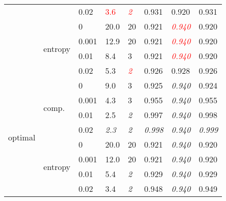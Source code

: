 \begin{table}[h]
\begin{tabularx}{\textwidth}{|X|X|X|X|X|X|X|X|}
		&                          & 0.02      & \textcolor{red}{3.6}     & \textcolor{red}{\textit{2}} & 0.931          & 0.920                & 0.931          \\ \cline{2-8} 
		& \multirow{4}{*}{entropy} & 0         & 20.0          & 20               & 0.921          & \textcolor{red}{\textit{0.940}} & 0.920          \\ \cline{3-8} 
		&                          & 0.001     & 12.9          & 20               & 0.921          & \textcolor{red}{\textit{0.940}} & 0.920          \\ \cline{3-8} 
		&                          & 0.01      & 8.4           & 3                & 0.921          & \textcolor{red}{\textit{0.940}} & 0.920          \\ \cline{3-8} 
		&                          & 0.02      & 5.3           & \textcolor{red}{\textit{2}} & 0.926          & 0.928                & 0.926          \\ \hline
		\multirow{8}{*}{optimal} & \multirow{4}{*}{comp.}   & 0         & 9.0           & 3                & 0.925          & \textit{0.940}       & 0.924          \\ \cline{3-8} 
		&                          & 0.001     & 4.3           & 3                & 0.955          & \textit{0.940}       & 0.955          \\ \cline{3-8} 
		&                          & 0.01      & 2.5           & \textit{2}       & 0.997          & \textit{0.940}       & 0.998          \\ \cline{3-8} 
		&                          & 0.02      & \textit{2.3}  & \textit{2}       & \textit{0.998} & \textit{0.940}       & \textit{0.999} \\ \cline{2-8} 
		& \multirow{4}{*}{entropy} & 0         & 20.0          & 20               & 0.921          & \textit{0.940}       & 0.920          \\ \cline{3-8} 
		&                          & 0.001     & 12.0          & 20               & 0.921          & \textit{0.940}       & 0.920          \\ \cline{3-8} 
		&                          & 0.01      & 5.4           & \textit{2}       & 0.929          & \textit{0.940}       & 0.929          \\ \cline{3-8} 
		&                          & 0.02      & 3.4           & \textit{2}       & 0.948          & \textit{0.940}       & 0.949          \\ \hline 
	\end{tabularx}
\end{table}







